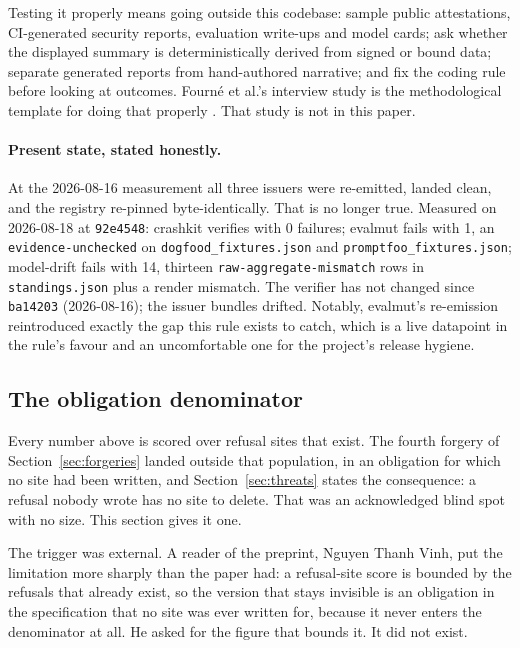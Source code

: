 \documentclass[11pt]{article}
\begin{document}
Testing it properly means going outside this codebase: sample public attestations,
CI-generated security reports, evaluation write-ups and model cards; ask whether the displayed
summary is deterministically derived from signed or bound data; separate generated reports
from hand-authored narrative; and fix the coding rule before looking at outcomes. Fourn\'e et
al.'s interview study is the methodological template for doing that properly
\citep{fourne2023flossing}. That study is not in this paper.

\paragraph{Present state, stated honestly.} At the 2026-08-16 measurement all three issuers
were re-emitted, landed clean, and the registry re-pinned byte-identically. That is no longer
true. Measured on 2026-08-18 at \texttt{92e4548}: crashkit verifies with 0 failures; evalmut
fails with 1, an \texttt{evidence-unchecked} on \texttt{dogfood\_fixtures.json} and
\texttt{promptfoo\_fixtures.json}; model-drift fails with 14, thirteen
\texttt{raw-aggregate-mismatch} rows in \texttt{standings.json} plus a render mismatch. The
verifier has not changed since \texttt{ba14203} (2026-08-16); the issuer bundles drifted. Notably,
evalmut's re-emission reintroduced exactly the gap this rule exists to catch, which is a live
datapoint in the rule's favour and an uncomfortable one for the project's release hygiene.

\subsection{The obligation denominator}
\label{sec:obligation-denominator}

Every number above is scored over refusal sites that exist. The fourth forgery of
Section~\ref{sec:forgeries} landed outside that population, in an obligation for which no site
had been written, and Section~\ref{sec:threats} states the consequence: a refusal nobody wrote
has no site to delete. That was an acknowledged blind spot with no size. This section gives it
one.

The trigger was external. A reader of the preprint, Nguyen Thanh Vinh, put the limitation more
sharply than the paper had: a refusal-site score is bounded by the refusals that already exist,
so the version that stays invisible is an obligation in the specification that no site was ever
written for, because it never enters the denominator at all. He asked for the figure that bounds
it. It did not exist.
\end{document}
